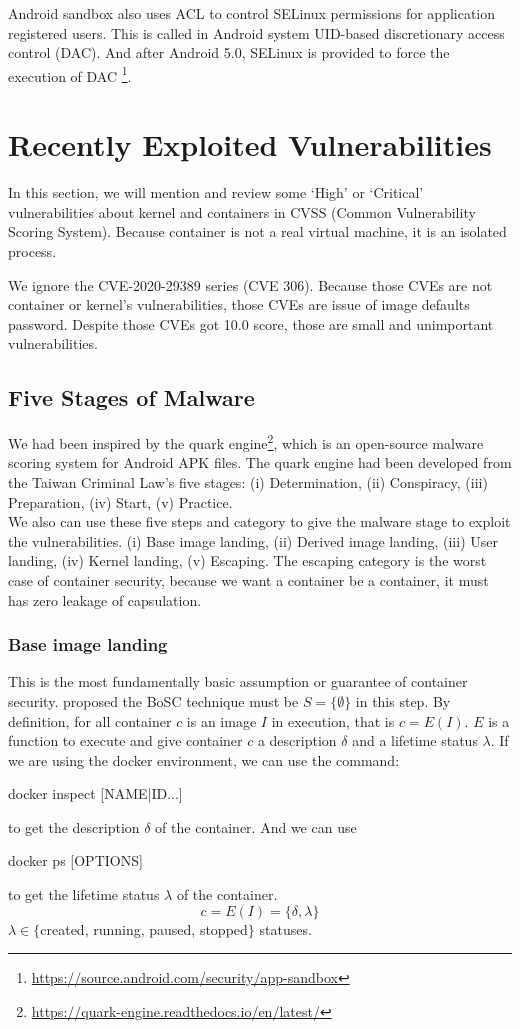 Android sandbox also uses ACL to control SELinux permissions for application registered users.
This is called in Android system UID-based discretionary access control (DAC).
And after Android 5.0, SELinux is provided to force the execution of DAC
\footnote{\url{https://source.android.com/security/app-sandbox}}.

\section{Recently Exploited Vulnerabilities}
In this section, we will mention and review some `High' or `Critical' vulnerabilities
about kernel and containers in CVSS (Common Vulnerability Scoring System).
Because container is not a real virtual machine, it is an isolated process.

We ignore the CVE-2020-29389 series (CVE 306). Because those CVEs are not container or kernel's
vulnerabilities, those CVEs are issue of image defaults password. Despite those CVEs got 10.0 score,
those are small and unimportant vulnerabilities.

\subsection{Five Stages of Malware}
\label{Five_stage_of_malware}
We had been inspired by the quark engine\footnote{\url{https://quark-engine.readthedocs.io/en/latest/}},
which is an open-source malware scoring system for Android APK files. The quark
engine had been developed from the Taiwan Criminal Law's five stages:
(\Rn{1}) Determination, (\Rn{2}) Conspiracy, (\Rn{3}) Preparation, (\Rn{4}) Start, (\Rn{5}) Practice.\\

We also can use these five steps and category to give the malware stage to exploit the vulnerabilities.
(\Rn{1}) Base image landing, (\Rn{2}) Derived image landing, (\Rn{3}) User landing, (\Rn{4}) Kernel landing,
(\Rn{5}) Escaping. The escaping category is the worst case of container security, because we want a
container be a container, it must has zero leakage of capsulation.

\subsubsection{Base image landing}
This is the most fundamentally basic assumption or guarantee of container security.
\textcite{inproceedings} proposed the BoSC technique must be $S = \{\emptyset\}$ in this step. By definition, for all
container $c$ is an image $I$ in execution, that is  $c = E(I)$. $E$ is a function to execute and
give container $c$ a description $\delta$ and a lifetime status $\lambda$. If we are using the docker environment, we can use the command:
\begin{codebash}
    docker inspect [NAME|ID...]
\end{codebash}
to get the description $\delta$ of the container. And we can use
\begin{codebash}
    docker ps [OPTIONS]
\end{codebash}
to get the lifetime status $\lambda$ of the container.
$$c=E(I)=\{\delta, \lambda\}$$
$\lambda \in \{$created, running, paused, stopped$\}$ statuses.

